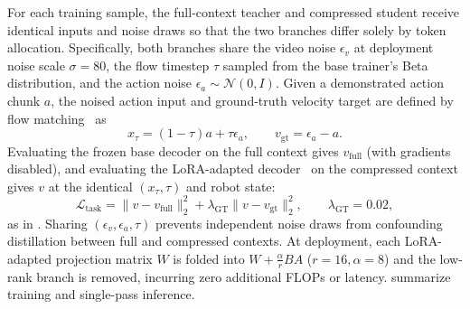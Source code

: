 For each training sample, the full-context teacher and compressed student receive identical inputs and noise draws so that the two branches differ solely by token allocation.
Specifically, both branches share the video noise $\epsilon_v$ at deployment noise scale $\sigma = 80$, the flow timestep $\tau$ sampled from the base trainer's Beta distribution, and the action noise $\epsilon_a \sim \mathcal{N}(0, I)$.
Given a demonstrated action chunk $a$, the noised action input and ground-truth velocity target are defined by flow matching~\cite{lipman2023flow} as
\begin{equation}
    x_\tau = (1 - \tau) a + \tau \epsilon_a, \qquad v_{\text{gt}} = \epsilon_a - a.
    \label{eq:supp_flow}
\end{equation}
Evaluating the frozen base decoder on the full context gives $v_{\text{full}}$ (with gradients disabled), and evaluating the LoRA-adapted decoder~\cite{hu2022lora} on the compressed context gives $v$ at the identical $(x_\tau, \tau)$ and robot state:
\begin{equation}
    \mathcal{L}_{\text{task}} = \|v - v_{\text{full}}\|_2^2 + \lambda_{\text{GT}} \|v - v_{\text{gt}}\|_2^2, \qquad \lambda_{\text{GT}} = 0.02,
    \label{eq:supp_task}
\end{equation}
as in .
Sharing $(\epsilon_v, \epsilon_a, \tau)$ prevents independent noise draws from confounding distillation between full and compressed contexts.
At deployment, each LoRA-adapted projection matrix $W$ is folded into $W + \frac{\alpha}{r} B A$ ($r = 16, \alpha = 8$) and the low-rank branch is removed, incurring zero additional FLOPs or latency.
 summarize training and single-pass inference.




